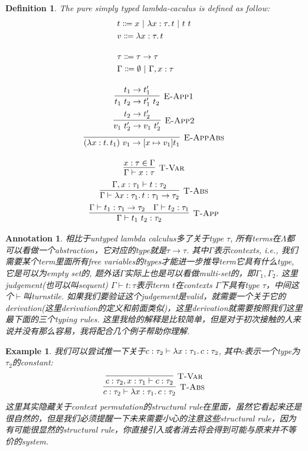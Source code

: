 \documentclass{article}
\newtheorem{example}[theorem]{Example}
\newtheorem{definition}[theorem]{Definition}
\newtheorem{annotation}[theorem]{Annotation}
\newcommand{\lam}[2]{\ensuremath{\lambda #1\ldotp #2}} %
\newcommand{\termtype}[2]{\ensuremath{#1:#2}}
\begin{document}
\begin{definition}
\rm The pure simply typed lambda-caculus is defined as follow:
\[
	\begin{gathered}
	\begin{aligned}
	&t \Coloneqq x ~|~ \lam{\termtype{x}{\tau}}{t} ~|~ t~t \\
	&v \Coloneqq \lam{\termtype{x}{\tau}}{t} \\[1em]
	&\tau \Coloneqq \tau \to \tau \\
	&\Gamma \Coloneqq \emptyset ~|~ \Gamma, \termtype{x}{\tau}
	\end{aligned} \\[1em]
	\infer[\textsc{E-App1}]{t_1~t_2 \to t_1'~t_2}{t_1 \to t_1'} \\
	\infer[\textsc{E-App2}]{v_1~t_2' \to v_1~t_2'}{t_2 \to t_2'} \\
	\infer[\textsc{E-AppAbs}]{(\lam{\termtype{x}{t}}{t_1})~v_1 \to [x \mapsto v_1] t_1}{} \\[1em]
	\infer[\textsc{T-Var}]{\Gamma \vdash \termtype{x}{\tau}}{\termtype{x}{\tau} \in \Gamma} \\
	\infer[\textsc{T-Abs}]{\Gamma \vdash \termtype{\lam{\termtype{x}{\tau_1}}{t}}{\tau_1 \to \tau_2}}{\Gamma, \termtype{x}{\tau_1} \vdash \termtype{t}{\tau_2}} \\
	\infer[\textsc{T-App}]{\Gamma \vdash \termtype{t_1~t_2}{\tau_2}}{\Gamma \vdash \termtype{t_1}{\tau_1 \to \tau_2} & \Gamma \vdash \termtype{t_2}{\tau_1}}
	\end{gathered}
\]
\end{definition}

\begin{annotation}
\rm 相比于untyped lambda calculus多了关于type $\tau$, 所有terms在$\Lambda$都可以看做一个abstraction，它对应的type就是$\tau \to \tau$. 其中$\Gamma$表示contexts, i.e., 我们需要某个term里面所有free variables的types才能进一步推导term它具有什么type, 它是可以为empty set的, 题外话$\Gamma$实际上也是可以看做multi-set的，即$\Gamma_1, \Gamma_2$. 这里judgement(也可以叫sequent) $\Gamma \vdash t:\tau$表示term $t$在contexts $\Gamma$下具有type $\tau$，中间这个$\vdash$叫turnstile. 如果我们要验证这个judgement是valid，就需要一个关于它的derivation(这里derivation的定义和前面类似)，这里derivation就需要按照我们这里最下面的三个typing rules. 这里我给的解释是比较简单，但是对于初次接触的人来说并没有那么容易，我将配合几个例子帮助你理解. 
\end{annotation}

\begin{example}
\rm 我们可以尝试推一下关于$\termtype{c}{\tau_2}\vdash \termtype{\lam{\termtype{x}{\tau_1}}{c}}{\tau_2}$, 其中$c$表示一个type为$\tau_2$的constant:
\[
	\infer[\textsc{T-Abs}]{\termtype{c}{\tau_2}\vdash \termtype{\lam{\termtype{x}{\tau_1}}{c}}{\tau_2}}{\infer[\textsc{T-Var}]{\termtype{c}{\tau_2},\termtype{x}{\tau_1} \vdash \termtype{c}{\tau_2}}{}}
\]
这里其实隐藏关于context permutation的structural rule在里面，虽然它看起来还是很自然的，但是我们必须提醒一下未来需要小心的注意这些structural rule，因为有可能很显然的structural rule，你直接引入或者消去将会得到可能与原来并不等价的system.  
\end{example}
\end{document}
